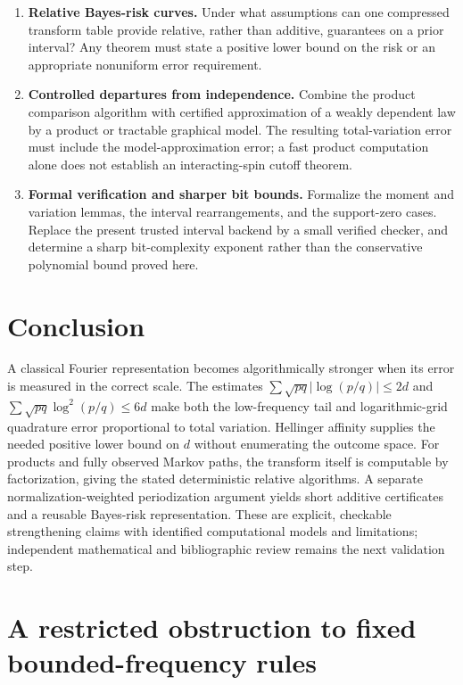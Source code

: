 \documentclass[11pt]{article}
\theoremstyle{definition}
\theoremstyle{remark}
\begin{document}
\begin{enumerate}[label=\textbf{\arabic*.},leftmargin=*]
\item \textbf{Relative Bayes-risk curves.} Under what assumptions can one compressed transform table provide relative, rather than additive, guarantees on a prior interval? Any theorem must state a positive lower bound on the risk or an appropriate nonuniform error requirement.

\item \textbf{Controlled departures from independence.} Combine the product comparison algorithm with certified approximation of a weakly dependent law by a product or tractable graphical model. The resulting total-variation error must include the model-approximation error; a fast product computation alone does not establish an interacting-spin cutoff theorem.

\item \textbf{Formal verification and sharper bit bounds.} Formalize the moment and variation lemmas, the interval rearrangements, and the support-zero cases. Replace the present trusted interval backend by a small verified checker, and determine a sharp bit-complexity exponent rather than the conservative polynomial bound proved here.
\end{enumerate}

\section{Conclusion}

A classical Fourier representation becomes algorithmically stronger when its error is measured in the correct scale. The estimates $\sum\sqrt{pq}|\log(p/q)|\le2d$ and $\sum\sqrt{pq}\log^2(p/q)\le6d$ make both the low-frequency tail and logarithmic-grid quadrature error proportional to total variation. Hellinger affinity supplies the needed positive lower bound on $d$ without enumerating the outcome space. For products and fully observed Markov paths, the transform itself is computable by factorization, giving the stated deterministic relative algorithms. A separate normalization-weighted periodization argument yields short additive certificates and a reusable Bayes-risk representation. These are explicit, checkable strengthening claims with identified computational models and limitations; independent mathematical and bibliographic review remains the next validation step.

\appendix
\section{A restricted obstruction to fixed bounded-frequency rules}
\label{app:obstruction}
\end{document}
